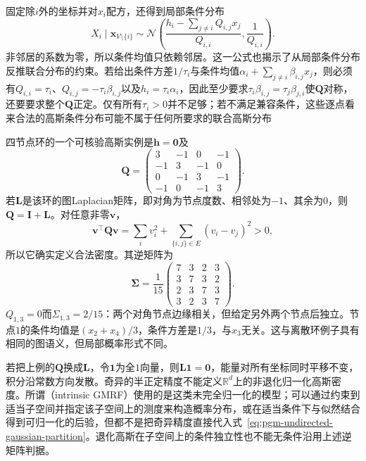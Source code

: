 固定除$i$外的坐标并对$x_i$配方，还得到局部条件分布
\begin{equation}
  X_i\mid\bm{x}_{V\setminus\{i\}}
  \sim\mathcal{N}\left(
    \frac{h_i-\sum_{j\neq i}Q_{i,j}x_j}{Q_{i,i}},
    \frac{1}{Q_{i,i}}\right).
  \label{eq:pgm-undirected-gaussian-conditional}
\end{equation}
非邻居的系数为零，所以条件均值只依赖邻居。这一公式也揭示了从局部条件分布反推联合分布的约束。若给出条件方差$1/\tau_i$与条件均值$\alpha_i+\sum_{j\neq i}\beta_{i,j}x_j$，则必须有$Q_{i,i}=\tau_i$、$Q_{i,j}=-\tau_i\beta_{i,j}$以及$h_i=\tau_i\alpha_i$，因此至少要求$\tau_i\beta_{i,j}=\tau_j\beta_{j,i}$使$\bm{Q}$对称，还要要求整个$\bm{Q}$正定。仅有所有$\tau_i>0$并不足够；若不满足兼容条件，这些逐点看来合法的高斯条件分布可能不属于任何所要求的联合高斯分布

四节点环的一个可核验高斯实例是$\bm{h}=\bm{0}$及
\[
  \bm{Q}=
  \begin{pmatrix}
    3&-1&0&-1\\
    -1&3&-1&0\\
    0&-1&3&-1\\
    -1&0&-1&3
  \end{pmatrix}.
\]
若$\bm{L}$是该环的图Laplacian矩阵，即对角为节点度数、相邻处为$-1$、其余为$0$，则$\bm{Q}=\bm{I}+\bm{L}$。对任意非零$\bm{v}$，
\[
  \bm{v}^{\top}\bm{Q}\bm{v}
  =\sum_i v_i^2+\sum_{\{i,j\}\in E}(v_i-v_j)^2>0,
\]
所以它确实定义合法密度。其逆矩阵为
\[
  \bm{\Sigma}=\frac{1}{15}
  \begin{pmatrix}
    7&3&2&3\\
    3&7&3&2\\
    2&3&7&3\\
    3&2&3&7
  \end{pmatrix}.
\]
$Q_{1,3}=0$而$\Sigma_{1,3}=2/15$：两个对角节点边缘相关，但给定另外两个节点后独立。节点$1$的条件均值是$(x_2+x_4)/3$，条件方差是$1/3$，与$x_3$无关。这与离散环例子具有相同的图语义，但局部概率形式不同。

若把上例的$\bm{Q}$换成$\bm{L}$，令$\bm{1}$为全$1$向量，则$\bm{L}\bm{1}=\bm{0}$，能量对所有坐标同时平移不变，积分沿常数方向发散。奇异的半正定精度不能定义$\mathbb{R}^d$上的非退化归一化高斯密度。所谓（intrinsic GMRF）使用的是这类未完全归一化的模型；可以通过约束到适当子空间并指定该子空间上的测度来构造概率分布，或在适当条件下与似然结合得到可归一化的后验，但都不是把奇异精度直接代入式~\eqref{eq:pgm-undirected-gaussian-partition}。退化高斯在子空间上的条件独立性也不能无条件沿用上述逆矩阵判据。

